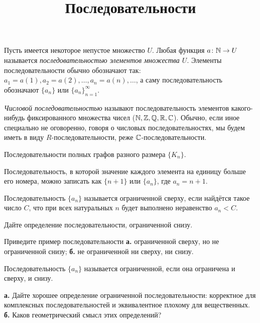 \documentclass[a4paper, 12pt, num=24]{listok}
\begin{document}
\title{Последовательности}
\maketitle{}
\begin{definition}
	Пусть имеется некоторое непустое множество $U$.
	Любая функция $a \colon \mathbb{N} \to U$ называется \textit{последовательностью элементов множества $U$}.
	Элементы последовательности обычно обозначают так: $a_1 = a(1), a_2 = a(2), \ldots, a_n = a(n), \ldots$,
	а саму последовательность обозначают $\{a_n\}$ или ${\{a_n\}}_{n = 1}^{\infty}$.

	\textit{Числовой последовательностью} называют последовательность элементов какого-нибудь фиксированного множества чисел ($\mathbb{N}, \mathbb{Z}, \mathbb{Q}, \mathbb{R}, \mathbb{C}$).
	Обычно, если иное специально не оговоренно, говоря о числовых последовательностях, мы будем иметь в виду $R$-последовательности, реже $\mathbb{C}$-последовательности.
\end{definition}
\begin{example}
	Последовательности полных графов разного размера $\{K_n\}$.
\end{example}
\begin{example}
	Последовательность, в которой значение каждого элемента на единицу больше его номера,
	можно записать как $\{n + 1\}$ или $\{a_n\}$, где $a_n = n + 1$.
\end{example}
\begin{definition}
	Последовательность $\{a_n\}$ называется ограниченной сверху, если найдётся такое число $C$,
	что при всех натуральных $n$ будет выполнено неравенство $a_n < C$.
\end{definition}
\begin{problem}
	Дайте определение последовательности, ограниченной снизу.
\end{problem}
\begin{problem}
	Приведите пример последовательности \textbf{а.} ограниченной сверху, но не ограниченной снизу;
	\textbf{б.} не ограниченной ни сверху, ни снизу.
\end{problem}
\begin{definition}[плохое]
	Последовательность $\{a_n\}$ называется ограниченной, если она ограничена и сверху, и снизу.
\end{definition}
\begin{problem}
	\textbf{а.} Дайте хорошее определение ограниченной последовательности: корректное для комплексных последовательностей и эквивалентное плохому для вещественных.
	\textbf{б.} Каков геометрический смысл этих определений?
\end{problem}
\end{document}
